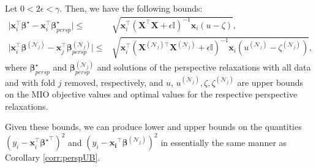 \documentclass[ijoc,noblindrev]{informs3} %
\newcommand{\ag}[1]{{\color{black}#1}}
\begin{document}

\begin{corollary}\label{corr:confidenceadjustment}
    Let $0 < 2\epsilon < \gamma$. Then, we have the following bounds:
    \begin{align}
       \vert \bm{x}_i^\top \bm{\beta}^\star - \bm{x}_i^\top \bm{\beta}_{persp}^\star\vert \leq & \sqrt{\bm{x}_i^\top \left(\bm{X}^\top \bm{X}+\epsilon\mathbb{I}\right)^{-1} \bm{x}_i(u-\zeta)},\\
        \vert \bm{x}_i^\top \bm{\beta}^{(\mathcal{N}_j)} -\bm{x}_j^\top \bm{\beta}_{persp}^{(\mathcal{N}_j)}\vert \leq & \sqrt{\bm{x}_i^\top \left(\bm{X}^{(\mathcal{N}_j)\top} \bm{X}^{(\mathcal{N}_j)}+\epsilon\mathbb{I}\right)^{-1} \bm{x}_i(u^{(\mathcal{N}_j)}-\zeta^{(\mathcal{N}_j)})},
    \end{align}
    \ag{where $\bm{\beta}_{persp}^{\star}$ and $\bm{\beta}_{persp}^{(\mathcal{N}_j)}$ and solutions of the perspective relaxations with all data and with fold $j$ removed, respectively, and $u$, $u^{(\mathcal{N}_j)},\zeta, \zeta^{(\mathcal{N}_j)}$ are upper bounds on the MIO objective values and optimal values for the respective perspective relaxations.}
\end{corollary}
Given these bounds, we can produce lower and upper bounds on the quantities $(y_i-\bm{x}_i^\top{\bm{\beta}^\star}^\top )^2$ and $(y_i-\bm{x_i}^\top\bm{\beta}^{(\mathcal{N}_j)})^2$ in essentially the same manner as Corollary \ref{corr:perspUB}. 
\end{document}
